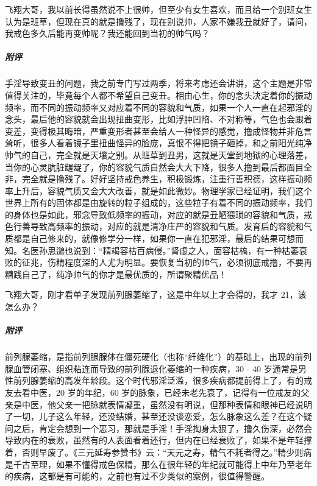 \begin{case}
    飞翔大哥，我以前长得虽然说不上很帅，但至少有女生喜欢，而且给一个别班女生认为是班草，但现在真的就是撸残了，现在别说帅，人家不嫌我丑就好了，请问，我戒色多久后能再变帅呢？我还能回到当初的帅气吗？
    \subparagraph{附评} 手淫导致变丑的问题，我之前专门写过两季，将来考虑还会讲讲，这个主题是非常值得关注的，毕竟每个人都不希望自己变丑。相由心生，你的念头决定着你的振动频率，而不同的振动频率又对应着不同的容貌和气质，如果一个人一直在起邪淫的念头，最后他的容貌就会出现扭曲变形，比如浮肿凹陷、不对称等，气色也会跟着变差，变得极其晦暗，严重变形者甚至会给人一种怪异的感觉，撸成怪物并非危言耸听，很多人看着镜子里扭曲怪异的脸庞，真恨不得把镜子砸掉，和之前阳光纯净帅气的自己，完全就是天壤之别。从班草到丑男，这就是天堂到地狱的心理落差，当你的心灵肮脏龌龊了，你的容貌气质自然会大大下降，很多人撸到最后都面目全非，完全就是撸残了。好好坚持戒色养生，积极锻炼，注重行善积德，这样振动频率上升后，容貌气质又会大大改善，就是如此微妙。物理学家已经证明，我们这个世界上所有的固体都是由旋转的粒子组成的，这些粒子有着不同的振动频率，我们的身体也是如此，邪念导致低频率的振动，对应的就是丑陋猥琐的容貌和气质，戒色行善导致高频率的振动，对应的就是清净庄严的容貌和气质。发育后的容貌和气质都是自己修来的，就像修学分一样，如果你一直在犯邪淫，最后的结果可想而知。名医孙思邈也说到：“精竭容枯百病侵。”肾虚之人，面容枯槁，有一种枯萎衰败的征兆，伤精程度深的人尤为明显。要恢复当初的帅气，必须彻底戒撸，不要再糟践自己了，纯净帅气的你才是最优质的，所谓聚精优品！
\end{case}

\begin{case}
    飞翔大哥，刚才看单子发现前列腺萎缩了，这是中年以上才会得的，我才 21，该怎么办？
    \subparagraph{附评} 前列腺萎缩，是指前列腺腺体在僵死硬化（也称“纤维化”）的基础上，出现的前列腺血管闭塞、组织粘连而导致的前列腺退化萎缩的一种疾病，30 - 40 岁通常是男性前列腺萎缩的高发年龄段。这个时代邪淫泛滥，很多疾病都提前得上了，有的戒友去看中医，20 岁的年纪，60 岁的脉象，已经未老先衰了，记得有一位戒友的父亲是中医，他父亲一把脉就表情凝重，虽然没有明说，但那种表情和眼神已经说明了一切，儿子这么年轻，还没结婚，甚至还没谈恋爱，怎么脉象这么差？在这个疑问之后，肯定会想到一个恶习，那就是手淫！手淫掏身太狠了，撸久伤深，必然会导致内在的衰败，虽然有的人表面看着还行，但内在已经衰败了，如果不是年轻撑着，否则早废了。《三元延寿参赞书》云：“天元之寿，精气不耗者得之。”精少则病是千古至理，如果不懂得戒色保精，那么在很年轻的年纪就可能得上中年乃至老年的疾病，这都是有可能的，之前也有过不少类似的案例，很值得警醒。
\end{case}

